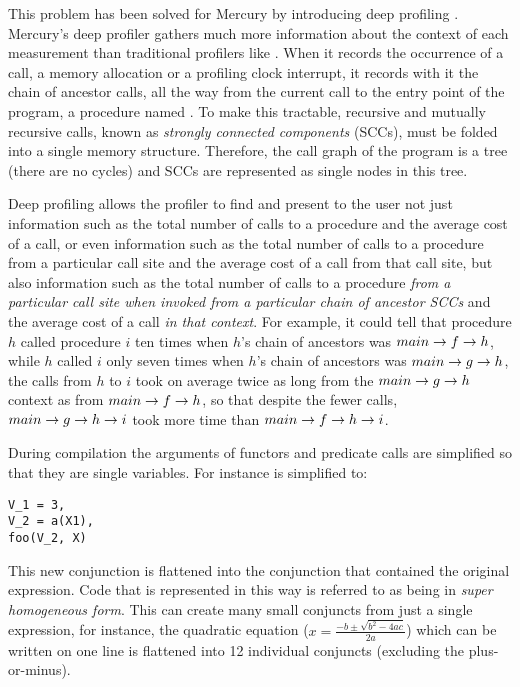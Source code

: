 This problem has been solved for Mercury by introducing deep profiling
\citep{conway:2001:mercury-deep}.
Mercury's deep profiler gathers much more information about the context of
each measurement than traditional profilers like \cite{gprof}.
When it records the occurrence of a call,
a memory allocation or a profiling clock interrupt,
it records with it the chain of ancestor calls,
all the way from the current call to the entry point of the program,
a procedure named .
To make this tractable,
recursive and mutually recursive calls,
known as \emph{strongly connected components} (SCCs),
must be folded into a single memory structure.
Therefore, the call graph of the program is a tree (there are no cycles)
and SCCs are represented as single nodes in this tree.

Deep profiling allows the profiler to find and present to the user
not just information such as the total number of calls to a procedure
and the average cost of a call,
or even information such as the total number of calls to a procedure
from a particular call site and the average cost of a call from that call site,
but also information such as the total number of calls to a procedure
\emph{from a particular call site
when invoked from a particular chain of ancestor SCCs}
and the average cost of a call \emph{in that context}.
For example, it could tell that
procedure $h$ called procedure $i$ ten times
when $h$'s chain of ancestors was $main \rightarrow f \rightarrow h$,
while $h$ called $i$ only seven times
when $h$'s chain of ancestors was $main \rightarrow g \rightarrow h$,
the calls from $h$ to $i$ took on average twice as long
from the $main \rightarrow g \rightarrow h$ context as from $main \rightarrow f \rightarrow h$,
so that despite the fewer calls,
$main \rightarrow g \rightarrow h \rightarrow i$ took more time than $main \rightarrow f \rightarrow h \rightarrow i$.

During compilation the arguments of functors and predicate calls are
simplified so that they are single variables.
For instance  is simplified to:

\begin{verbatim}
V_1 = 3,
V_2 = a(X1),
foo(V_2, X)
\end{verbatim}

\noindent
This new conjunction is flattened into the conjunction that contained the
original expression.
Code that is represented in this way is referred to as being in \emph{super
homogeneous form}.
This can create many small conjuncts from just a single expression,
for instance, the quadratic equation
($x=\frac{-b \pm \sqrt {b^2-4ac}}{2a}$) which can be written on one line
is flattened into 12 individual conjuncts (excluding the plus-or-minus).

